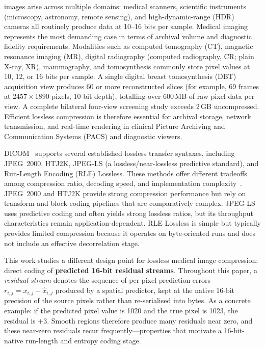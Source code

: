 \documentclass[journal]{IEEEtran}
\begin{document}
 images arise across multiple domains:
medical scanners, scientific instruments (microscopy, astronomy, remote
sensing), and high-dynamic-range (HDR) cameras all routinely produce data
at 10--16 bits per sample. Medical imaging represents the most demanding
case in terms of archival volume and diagnostic fidelity requirements.
Modalities such as computed tomography (CT), magnetic resonance imaging (MR),
digital radiography (computed radiography, CR; plain X-ray, XR), mammography,
and tomosynthesis commonly store pixel values at 10, 12, or 16 bits per sample.
A single digital breast tomosynthesis (DBT) acquisition view produces 60 or
more reconstructed slices (for example, 69 frames at $2457 \times 1890$
pixels, 10-bit depth), totalling over 600\,MB of raw pixel data per view. A
complete bilateral four-view screening study exceeds 2\,GB uncompressed.
Efficient lossless compression is therefore essential for archival storage,
network transmission, and real-time rendering in clinical Picture Archiving
and Communication Systems (PACS) and diagnostic viewers.

DICOM~\cite{dicom} supports several established lossless transfer syntaxes,
including JPEG~2000, HTJ2K, JPEG-LS (a lossless/near-lossless predictive
standard), and Run-Length Encoding (RLE) Lossless. These methods offer
different tradeoffs among compression ratio, decoding speed, and
implementation complexity~\cite{liu2017,clunie2000}. JPEG~2000 and HTJ2K
provide strong compression performance but rely on transform and block-coding
pipelines that are comparatively complex. JPEG-LS uses predictive coding and
often yields strong lossless ratios, but its throughput characteristics remain
application-dependent. RLE Lossless is simple but typically provides limited
compression because it operates on byte-oriented runs and does not include an
effective decorrelation stage.

This work studies a different design point for lossless medical image
compression: direct coding of \textbf{predicted 16-bit residual streams}.
Throughout this paper, a \emph{residual stream} denotes the sequence of
per-pixel prediction errors $r_{i,j} = x_{i,j} - \hat{x}_{i,j}$ produced by a
spatial predictor, kept at the native 16-bit precision of the source pixels
rather than re-serialised into bytes. As a concrete example: if the predicted
pixel value is 1020 and the true pixel is 1023, the residual is $+3$.
Smooth regions therefore produce many residuals near zero, and these near-zero
residuals recur frequently---properties that motivate a 16-bit-native
run-length and entropy coding stage.
\end{document}

